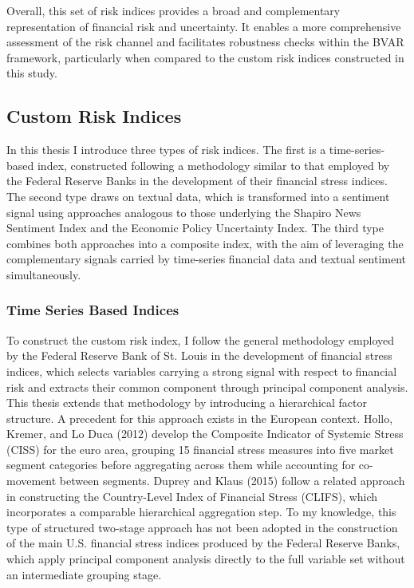 \documentclass[12pt,a4paper]{report}
\begin{document}
Overall, this set of risk indices provides a broad and complementary representation of 
financial risk and uncertainty. It enables a more comprehensive assessment of the risk 
channel and facilitates robustness checks within the BVAR framework, particularly when 
compared to the custom risk indices constructed in this study.

\subsection{Custom Risk Indices}
In this thesis I introduce three types of risk indices. The first is a time-series-based index, constructed following a methodology similar to that employed by the Federal Reserve Banks in the development of their financial stress indices. The second type draws on textual data, which is transformed into a sentiment signal using approaches analogous to those underlying the Shapiro News Sentiment Index and the Economic Policy Uncertainty Index. The third type combines both approaches into a composite index, with the aim of leveraging the complementary signals carried by time-series financial data and textual sentiment simultaneously.

\subsubsection{Time Series Based Indices}
To construct the custom risk index, I follow the general methodology employed by the Federal Reserve Bank of St. Louis in the development of financial stress indices, which selects variables carrying a strong signal with respect to financial risk and extracts their common component through principal component analysis.
This thesis extends that methodology by introducing a hierarchical factor structure. A precedent for this approach exists in the European context. Hollo, Kremer, and Lo Duca (2012) develop the Composite Indicator of Systemic Stress (CISS) for the euro area, grouping 15 financial stress measures into five market segment categories before aggregating across them while accounting for co-movement between segments. Duprey and Klaus (2015) follow a related approach in constructing the Country-Level Index of Financial Stress (CLIFS), which incorporates a comparable hierarchical aggregation step. To my knowledge, this type of structured two-stage approach has not been adopted in the construction of the main U.S. financial stress indices produced by the Federal Reserve Banks, which apply principal component analysis directly to the full variable set without an intermediate grouping stage.
\end{document}
